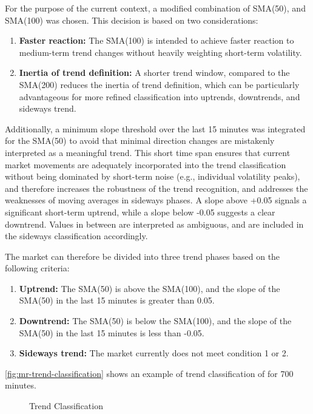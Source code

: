 For the purpose of the current context, a modified combination of SMA(50), and SMA(100) was chosen.
This decision is based on two considerations:

\begin{enumerate}
    \item \textbf{Faster reaction:} The SMA(100) is intended to achieve faster reaction to medium-term trend changes without heavily weighting short-term volatility.
    \item \textbf{Inertia of trend definition:} A shorter trend window, compared to the SMA(200) reduces the inertia of trend definition, which can be particularly advantageous for more refined classification into uptrends, downtrends, and sideways trend.
\end{enumerate}

Additionally, a minimum slope threshold over the last 15 minutes was integrated for the SMA(50) to avoid that minimal direction changes are mistakenly interpreted as a meaningful trend.
This short time span ensures that current market movements are adequately incorporated into the trend classification without being dominated by short-term noise (e.g., individual volatility peaks), and therefore increases the robustness of the trend recognition, and addresses the weaknesses of moving averages in sideways phases.
A slope above +0.05 signals a significant short-term uptrend, while a slope below -0.05 suggests a clear downtrend.
Values in between are interpreted as ambiguous, and are included in the sideways classification accordingly.

The market can therefore be divided into three trend phases based on the following criteria:

\begin{enumerate}
    \item \textbf{Uptrend:} The SMA(50) is above the SMA(100), and the slope of the SMA(50) in the last 15 minutes is greater than 0.05.
    \item \textbf{Downtrend:} The SMA(50) is below the SMA(100), and the slope of the SMA(50) in the last 15 minutes is less than -0.05.
    \item \textbf{Sideways trend:} The market currently does not meet condition 1 or 2.
\end{enumerate}

\autoref{fig:mr-trend-classification} shows an example of trend classification of \ethusdc for 700 minutes.

\begin{figure}[H]
    \centering
    
    \caption{Trend Classification}
    \label{fig:mr-trend-classification}
\end{figure}

